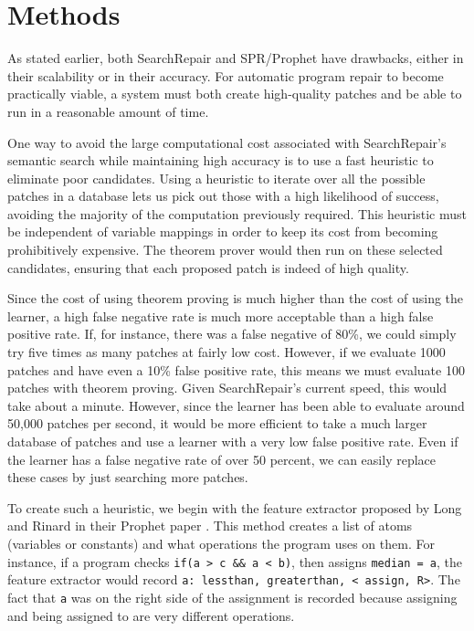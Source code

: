 \documentclass{paper}
\begin{document}
\section{Methods}


As stated earlier, both SearchRepair and SPR/Prophet have drawbacks, either in their scalability or in their accuracy. 
For automatic program repair to become practically viable, a system must both create high-quality patches and be able to run in a reasonable amount of time.

One way to avoid the large computational cost associated with SearchRepair's semantic search while maintaining high accuracy is to use a fast heuristic to eliminate poor candidates. 
Using a heuristic to iterate over all the possible patches in a database lets us pick out those with a high likelihood of success, avoiding the majority of the computation previously required. 
This heuristic must be independent of variable mappings in order to keep its cost from becoming prohibitively expensive. 
The theorem prover would then run on these selected candidates, ensuring that each proposed patch is indeed of high quality.

Since the cost of using theorem proving is much higher than the cost of using the learner, a high false negative rate is much more acceptable than a high false positive rate. 
If, for instance, there was a false negative of 80\%, we could simply try five times as many patches at fairly low cost. 
However, if we evaluate 1000 patches and have even a 10\% false positive rate, this means we must evaluate 100 patches with theorem proving. 
Given SearchRepair's current speed, this would take about a minute. 
However, since the learner has been able to evaluate around 50,000 patches per second, it would be more efficient to take a much larger database of patches and use a learner with a very low false positive rate. 
Even if the learner has a false negative rate of over 50 percent, we can easily replace these cases by just searching more patches.

To create such a heuristic, we begin with the feature extractor proposed by Long and Rinard in their Prophet paper \cite{Prophet}. 
This method creates a list of atoms (variables or constants) and what operations the program uses on them. 
For instance, if a program checks \texttt{if(a > c \&\& a < b)}, then assigns \texttt{median = a}, the feature extractor would record \texttt{a: lessthan, greaterthan, < assign, R>}. 
The fact that \texttt{a} was on the right side of the assignment is recorded because assigning and being assigned to are very different operations. 
\end{document}
